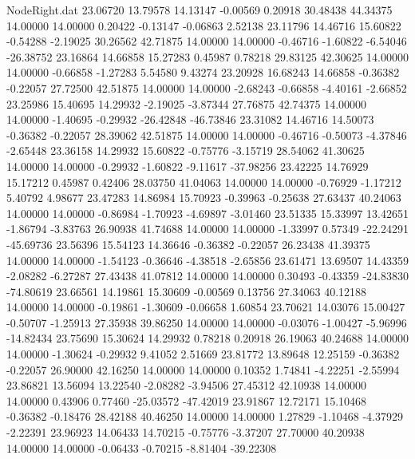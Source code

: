 \begin{filecontents}{NodeRight.dat}
  23.06720   13.79578   14.13147    -0.00569    0.20918   30.48438   44.34375   14.00000   14.00000    0.20422   -0.13147   -0.06863    2.52138
  23.11796   14.46716   15.60822    -0.54288   -2.19025   30.26562   42.71875   14.00000   14.00000   -0.46716   -1.60822   -6.54046  -26.38752
  23.16864   14.66858   15.27283     0.45987    0.78218   29.83125   42.30625   14.00000   14.00000   -0.66858   -1.27283    5.54580    9.43274
  23.20928   16.68243   14.66858    -0.36382   -0.22057   27.72500   42.51875   14.00000   14.00000   -2.68243   -0.66858   -4.40161   -2.66852
  23.25986   15.40695   14.29932    -2.19025   -3.87344   27.76875   42.74375   14.00000   14.00000   -1.40695   -0.29932  -26.42848  -46.73846
  23.31082   14.46716   14.50073    -0.36382   -0.22057   28.39062   42.51875   14.00000   14.00000   -0.46716   -0.50073   -4.37846   -2.65448
  23.36158   14.29932   15.60822    -0.75776   -3.15719   28.54062   41.30625   14.00000   14.00000   -0.29932   -1.60822   -9.11617  -37.98256
  23.42225   14.76929   15.17212     0.45987    0.42406   28.03750   41.04063   14.00000   14.00000   -0.76929   -1.17212    5.40792    4.98677
  23.47283   14.86984   15.70923    -0.39963   -0.25638   27.63437   40.24063   14.00000   14.00000   -0.86984   -1.70923   -4.69897   -3.01460
  23.51335   15.33997   13.42651    -1.86794   -3.83763   26.90938   41.74688   14.00000   14.00000   -1.33997    0.57349  -22.24291  -45.69736
  23.56396   15.54123   14.36646    -0.36382   -0.22057   26.23438   41.39375   14.00000   14.00000   -1.54123   -0.36646   -4.38518   -2.65856
  23.61471   13.69507   14.43359    -2.08282   -6.27287   27.43438   41.07812   14.00000   14.00000    0.30493   -0.43359  -24.83830  -74.80619
  23.66561   14.19861   15.30609    -0.00569    0.13756   27.34063   40.12188   14.00000   14.00000   -0.19861   -1.30609   -0.06658    1.60854
  23.70621   14.03076   15.00427    -0.50707   -1.25913   27.35938   39.86250   14.00000   14.00000   -0.03076   -1.00427   -5.96996  -14.82434
  23.75690   15.30624   14.29932     0.78218    0.20918   26.19063   40.24688   14.00000   14.00000   -1.30624   -0.29932    9.41052    2.51669
  23.81772   13.89648   12.25159    -0.36382   -0.22057   26.90000   42.16250   14.00000   14.00000    0.10352    1.74841   -4.22251   -2.55994
  23.86821   13.56094   13.22540    -2.08282   -3.94506   27.45312   42.10938   14.00000   14.00000    0.43906    0.77460  -25.03572  -47.42019
  23.91867   12.72171   15.10468    -0.36382   -0.18476   28.42188   40.46250   14.00000   14.00000    1.27829   -1.10468   -4.37929   -2.22391
  23.96923   14.06433   14.70215    -0.75776   -3.37207   27.70000   40.20938   14.00000   14.00000   -0.06433   -0.70215   -8.81404  -39.22308

\end{filecontents}
